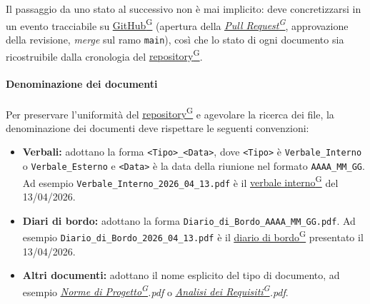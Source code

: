 \documentclass[a4paper,12pt]{article}
\providecommand{\glslink}[2]{\href{https://alittlebyte-19.github.io/Documentazione/glossario.html\#gls-#1}{\underline{#2}\textsuperscript{\scriptsize G}}}
\begin{document}
Il passaggio da uno stato al successivo non è mai implicito: deve concretizzarsi in un evento tracciabile su \glslink{github}{GitHub} (apertura della \textit{\glslink{pull-request}{Pull Request}}, approvazione della revisione, \textit{merge} sul ramo \texttt{main}), così che lo stato di ogni documento sia ricostruibile dalla cronologia del \glslink{repository}{repository}.

\paragraph{Denominazione dei documenti}
Per preservare l'uniformità del \glslink{repository}{repository} e agevolare la ricerca dei file, la denominazione dei documenti deve rispettare le seguenti convenzioni:

\begin{itemize}
    \item \textbf{Verbali:} adottano la forma \texttt{<Tipo>\_<Data>}, dove \texttt{<Tipo>} è \texttt{Verbale\_Interno} o \texttt{Verbale\_Esterno} e \texttt{<Data>} è la data della riunione nel formato \texttt{AAAA\_MM\_GG}. Ad esempio \texttt{Verbale\_Interno\_2026\_04\_13.pdf} è il \glslink{verbale-interno}{verbale interno} del 13/04/2026.
    \item \textbf{Diari di bordo:} adottano la forma \texttt{Diario\_di\_Bordo\_AAAA\_MM\_GG.pdf}. Ad esempio \texttt{Diario\_di\_Bordo\_2026\_04\_13.pdf} è il \glslink{diario-di-bordo}{diario di bordo} presentato il 13/04/2026.
    \item \textbf{Altri documenti:} adottano il nome esplicito del tipo di documento, ad esempio \textit{\glslink{norme-di-progetto}{Norme di Progetto}.pdf} o \textit{\glslink{analisi-dei-requisiti-adr}{Analisi dei Requisiti}.pdf}.
\end{itemize}
\end{document}
